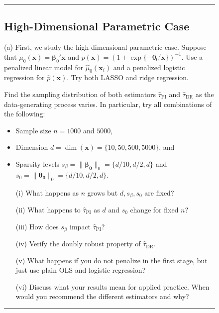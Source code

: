 \documentclass{article}
\newenvironment{colorparagraph}[1]{\par\color{#1}}{\par}
\begin{document}
\begin{figure}[H]
  \begin{colorparagraph}{questioncolor}
  \rule{\textwidth}{0.5pt}
  \label{q2a}
  \subsection{High-Dimensional Parametric Case}

  (a) First, we study the high-dimensional parametric case. Suppose that \( \mu_0(\mathbf{x}) = \boldsymbol{\beta}_0' \mathbf{x} \) and \( p(\mathbf{x}) = (1 + \exp\{-\boldsymbol{\theta}_0' \mathbf{x} \})^{-1} \). Use a penalized linear model for \( \hat{\mu}_0(\mathbf{x}_i) \) and a penalized logistic regression for \( \hat{p}(\mathbf{x}) \). Try both LASSO and ridge regression.

  Find the sampling distribution of both estimators $\hat{\tau}_{\text{PI}}$ and $\hat{\tau}_{\text{DR}}$ as the data-generating process varies. In particular, try all combinations of the following:
  
  \begin{itemize}
      \item Sample size \( n = 1000 \) and \( 5000 \),
      \item Dimension \( d = \dim(\mathbf{x}) = \{10, 50, 500, 5000\} \), and
      \item Sparsity levels \( s_\beta = \| \boldsymbol{\beta_0} \|_0 = \{d / 10, d / 2, d\} \) and \( s_0 = \| \boldsymbol{\theta_0} \|_0 = \{d / 10, d / 2, d\} \).
  \end{itemize}

  \begin{itemize}
      \item[(i)] What happens as \( n \) grows but \( d, s_\beta, s_0 \) are fixed?
      \item[(ii)] What happens to \( \hat{\tau}_{\text{PI}} \) as \( d \) and \( s_0 \) change for fixed \( n \)?
      \item[(iii)] How does \( s_\beta \) impact \( \hat{\tau}_{\text{PI}} \)?
      \item[(iv)] Verify the doubly robust property of \( \hat{\tau}_{\text{DR}} \).
      \item[(v)] What happens if you do not penalize in the first stage, but just use plain OLS and logistic regression?
      \item[(vi)] Discuss what your results mean for applied practice. When would you recommend the different estimators and why?
  \end{itemize}
  \rule{\textwidth}{0.5pt}
  \end{colorparagraph}
\end{figure}
\end{document}
